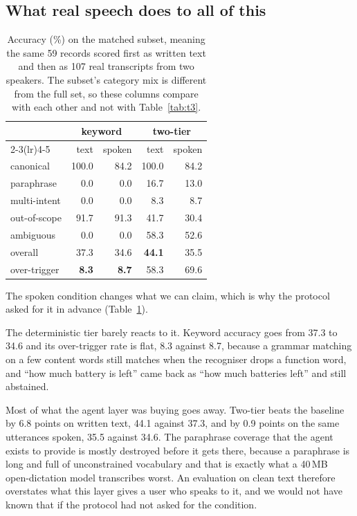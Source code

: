 \documentclass[sigconf,nonacm]{acmart}
\begin{document}
\subsection{What real speech does to all of this}

\begin{table}[t]
\caption{Accuracy (\%) on the matched subset, meaning the same 59 records scored
first as written text and then as 107 real transcripts from two speakers. The
subset's category mix is different from the full set, so these columns compare
with each other and not with Table~\ref{tab:t3}.}
\label{tab:asr}
\small
\begin{tabular}{lrrrr}
\toprule
 & \multicolumn{2}{c}{keyword} & \multicolumn{2}{c}{two-tier} \\
\cmidrule(lr){2-3}\cmidrule(lr){4-5}
 & text & spoken & text & spoken \\
\midrule
canonical      & 100.0 & 84.2 & 100.0 & 84.2 \\
paraphrase     & 0.0   & 0.0  & 16.7  & 13.0 \\
multi-intent   & 0.0   & 0.0  & 8.3   & 8.7  \\
out-of-scope   & 91.7  & 91.3 & 41.7  & 30.4 \\
ambiguous      & 0.0   & 0.0  & 58.3  & 52.6 \\
\midrule
overall        & 37.3  & 34.6 & \textbf{44.1} & 35.5 \\
over-trigger   & \textbf{8.3} & \textbf{8.7} & 58.3 & 69.6 \\
\bottomrule
\end{tabular}
\end{table}

The spoken condition changes what we can claim, which is why the protocol asked
for it in advance (Table~\ref{tab:asr}).

The deterministic tier barely reacts to it. Keyword accuracy goes from 37.3 to
34.6 and its over-trigger rate is flat, 8.3 against 8.7, because a grammar
matching on a few content words still matches when the recogniser drops a
function word, and ``how much battery is left'' came back as ``how much batteries
left'' and still abstained.

Most of what the agent layer was buying goes away. Two-tier beats the baseline
by 6.8 points on written text, 44.1 against 37.3, and by 0.9 points on the same
utterances spoken, 35.5 against 34.6. The paraphrase coverage that the agent
exists to provide is mostly destroyed before it gets there, because a paraphrase
is long and full of unconstrained vocabulary and that is exactly what a 40\,MB
open-dictation model transcribes worst. An evaluation on clean text therefore
overstates what this layer gives a user who speaks to it, and we would not have
known that if the protocol had not asked for the condition.
\end{document}
